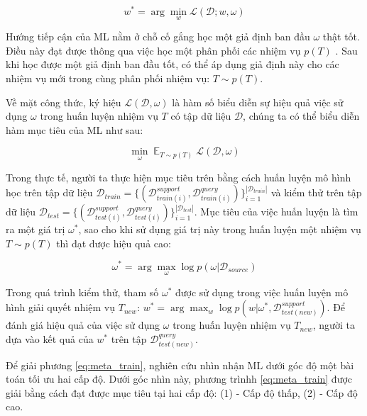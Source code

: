 \begin{equation}
    w^* = \arg \min_w \mathcal{L}(\mathcal{D}; w, \omega)
\end{equation}

Hướng tiếp cận của ML nằm ở chỗ cố gắng học một giả định ban đầu $\omega$ thật tốt. Điều này đạt được thông qua việc học một phân phối các nhiệm vụ $p(T)$ \cite{hospedales2020meta}. Sau khi học được một giả định ban đầu tốt, có thể áp dụng giả định này cho các nhiệm vụ mới trong cùng phân phối nhiệm vụ: $T \sim p(T)$.

Về mặt công thức, ký hiệu $\mathcal{L}(\mathcal{D}, \omega)$ là hàm số biểu diễn sự hiệu quả việc sử dụng $\omega$ trong huấn luyện nhiệm vụ $T$ có tập dữ liệu $\mathcal{D}$, chúng ta có thể biểu diễn hàm mục tiêu của ML như sau:

\begin{equation}
    \min_{\omega} \mathop{\mathbb{E}}_{T\sim p(T)} \mathcal{L}(\mathcal{D}, \omega)
\end{equation}

Trong thực tế, người ta thực hiện mục tiêu trên bằng cách huấn luyện mô hình học trên tập dữ liệu $\mathcal{D}_{train} = \{(\mathcal{D}_{train(i)}^{support}, \mathcal{D}_{train(i)}^{query})\}_{i=1}^{|\mathcal{D}_{train}|}$ và kiểm thử trên tập dữ liệu $\mathcal{D}_{test} = \{(\mathcal{D}_{test(i)}^{support}, \mathcal{D}_{test(i)}^{query})\}_{i=1}^{|\mathcal{D}_{test}|}$. Mục tiêu của việc huấn luyện là tìm ra một giá trị $\omega^*$, sao cho khi sử dụng giá trị này trong huấn luyện một nhiệm vụ $T\sim p(T)$ thì đạt được hiệu quả cao:

\begin{dmath}
    \label{eq:meta_train}
    \omega^* = \arg \max_{\omega} \log{p(\omega|\mathcal{D}_{source})}
\end{dmath}

Trong quá trình kiểm thử, tham số $\omega^*$ được sử dụng trong việc huấn luyện mô hình giải quyết nhiệm vụ $T_{new}$: $w^* = \arg \max_{w} \log{p(w|\omega^*, \mathcal{D}_{test(new)}^{support})}$. Để đánh giá hiệu quả của việc sử dụng $\omega$ trong huấn luyện nhiệm vụ $T_{new}$, người ta dựa vào kết quả của $w^*$ trên tập $\mathcal{D}_{test(new)}^{query}$.

Để giải phương \ref{eq:meta_train}, nghiên cứu \cite{hospedales2020meta} nhìn nhận ML dưới góc độ một bài toán tối ưu hai cấp độ. Dưới góc nhìn này, phương trìnhh \ref{eq:meta_train} được giải bằng cách đạt được mục tiêu tại hai cấp độ: (1) - Cấp độ thấp, (2) - Cấp độ cao.


